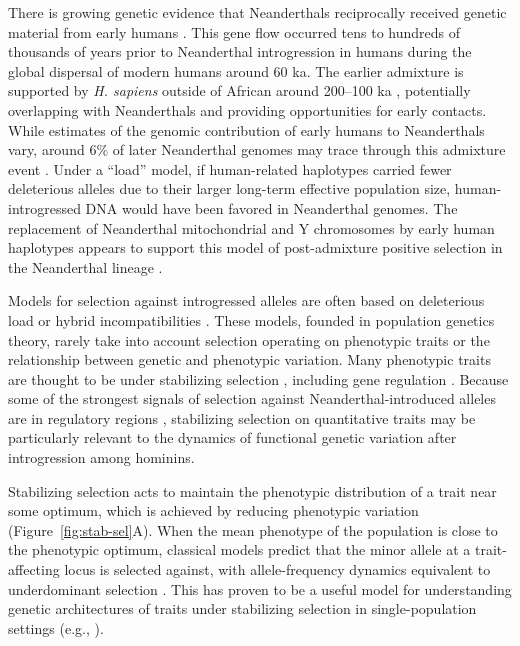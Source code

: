\documentclass[10pt,letterpaper]{article}
\begin{document}
There is growing genetic evidence that Neanderthals reciprocally received
genetic material from early humans \cite{kuhlwilm2016ancient,
hubisz2020mapping, harris2023diverse, li2024recurrent}. This gene flow occurred
tens to hundreds of thousands of years prior to Neanderthal introgression in
humans during the global dispersal of modern humans around 60 ka. The earlier
admixture is supported by \emph{H. sapiens} outside of African around 200--100
ka \cite{schwarcz1988esr, grun2005u, harvati2019apidima, beyer2021climatic},
potentially overlapping with Neanderthals and providing opportunities for early
contacts. While estimates of the genomic contribution of early humans to
Neanderthals vary, around $6\%$ of later Neanderthal genomes may trace through
this admixture event \cite{harris2023diverse}. Under a ``load'' model, if
human-related haplotypes carried fewer deleterious alleles due to their larger
long-term effective population size, human-introgressed DNA would have been
favored in Neanderthal genomes. The replacement of Neanderthal mitochondrial
and Y chromosomes by early human haplotypes appears to support this model of
post-admixture positive selection in the Neanderthal lineage
\cite{posth2017deeply, petr2020evolutionary}.

Models for selection against introgressed alleles are often based on
deleterious load or hybrid incompatibilities \cite{muller1942isolating}. These
models, founded in population genetics theory, rarely take into account
selection operating on phenotypic traits or the relationship between genetic
and phenotypic variation.  Many phenotypic traits are thought to be under
stabilizing selection \cite{sanjak2018evidence, sella2019thinking}, including
gene regulation \cite{gilad2006natural, hodgins2015gene, price2022detecting}.
Because some of the strongest signals of selection against
Neanderthal-introduced alleles are in regulatory regions
\cite{sankararaman2014genomic}, stabilizing selection on quantitative traits
may be particularly relevant to the dynamics of functional genetic variation
after introgression among hominins.

Stabilizing selection acts to maintain the phenotypic distribution of a trait
near some optimum, which is achieved by reducing phenotypic variation
(Figure~\ref{fig:stab-sel}A). When the mean phenotype of the population is
close to the phenotypic optimum, classical models predict that the minor allele
at a trait-affecting locus is selected against, with allele-frequency dynamics
equivalent to underdominant selection \cite{robertson1956effect}. This has
proven to be a useful model for understanding genetic architectures of traits
under stabilizing selection in single-population settings (e.g.,
\cite{keightley1988quantitative, simons2018population, hayward2022polygenic}).
\end{document}
